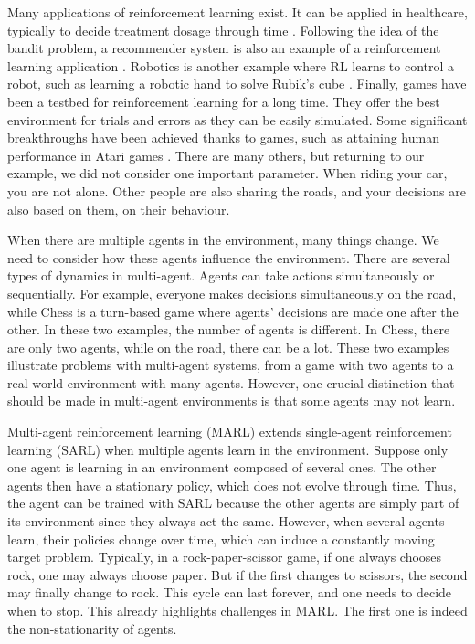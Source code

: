 Many applications of reinforcement learning exist.
It can be applied in healthcare, typically to decide treatment dosage through time \citep{miotto2018deep}.
Following the idea of the bandit problem, a recommender system is also an example of a reinforcement learning application \citep{mcinerney2018explore}.
Robotics is another example where RL learns to control a robot, such as learning a robotic hand to solve Rubik's cube \citep{akkaya2019solving}.
Finally, games have been a testbed for reinforcement learning for a long time. 
They offer the best environment for trials and errors as they can be easily simulated.
Some significant breakthroughs have been achieved thanks to games, such as attaining human performance in Atari games \citep{Mnih2015}.
There are many others, but returning to our example, we did not consider one important parameter.
When riding your car, you are not alone.
Other people are also sharing the roads, and your decisions are also based on them, on their behaviour.

When there are multiple agents in the environment, many things change.
We need to consider how these agents influence the environment.
There are several types of dynamics in multi-agent.
Agents can take actions simultaneously or sequentially.
For example, everyone makes decisions simultaneously on the road, while Chess is a turn-based game where agents' decisions are made one after the other.
In these two examples, the number of agents is different.
In Chess, there are only two agents, while on the road, there can be a lot.
These two examples illustrate problems with multi-agent systems, from a game with two agents to a real-world environment with many agents.
However, one crucial distinction that should be made in multi-agent environments is that some agents may not learn.

Multi-agent reinforcement learning (MARL) extends single-agent reinforcement learning (SARL) when multiple agents learn in the environment.
Suppose only one agent is learning in an environment composed of several ones.
The other agents then have a stationary policy, which does not evolve through time.
Thus, the agent can be trained with SARL because the other agents are simply part of its environment since they always act the same.
However, when several agents learn, their policies change over time, which can induce a constantly moving target problem.
Typically, in a rock-paper-scissor game, if one always chooses rock, one may always choose paper.
But if the first changes to scissors, the second may finally change to rock.
This cycle can last forever, and one needs to decide when to stop.
This already highlights challenges in MARL.
The first one is indeed the non-stationarity of agents.

